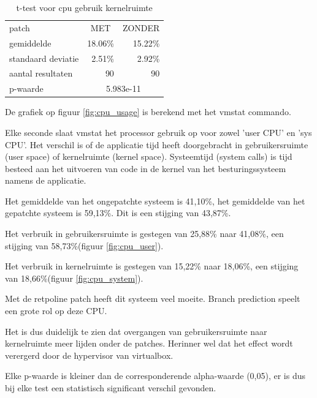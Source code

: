 \begin{table}[]
	\centering
	\caption{t-test voor cpu gebruik kernelruimte}
	\label{t_cpu_sys}
	\begin{tabular}{l|rr}
		\hline
		patch              & \multicolumn{1}{c}{MET} & \multicolumn{1}{c}{ZONDER} \\
		gemiddelde         & 18.06\%                 & 15.22\%                    \\
		standaard deviatie & 2.51\%                  & 2.92\%                     \\
		aantal resultaten  & 90                      & 90                         \\ \hline
		p-waarde           & \multicolumn{2}{c|}{5.983e-11}                      
	\end{tabular}
\end{table}


De grafiek op figuur \ref{fig:cpu_usage} is berekend met het vmstat commando.

Elke seconde slaat vmstat het processor gebruik op voor zowel 'user CPU' en 'sys CPU'.
Het verschil is of de applicatie tijd heeft doorgebracht in gebruikersruimte (user space) of kernelruimte (kernel space).
Systeemtijd (system calls) is tijd besteed aan het uitvoeren van code in de kernel van het besturingssysteem namens de applicatie.

Het gemiddelde van het ongepatchte systeem is 41,10\%, het gemiddelde van het gepatchte systeem is 59,13\%. Dit is een stijging van 43,87\%.

Het verbruik in gebruikersruimte is gestegen van 25,88\% naar 41,08\%, een stijging van 58,73\%(figuur \ref{fig:cpu_user}).

Het verbruik in kernelruimte is gestegen van 15,22\% naar 18,06\%, een stijging van 18,66\%(figuur \ref{fig:cpu_system}).

Met de retpoline patch heeft dit systeem veel moeite. Branch prediction speelt een grote rol op deze CPU.

Het is dus duidelijk te zien dat overgangen van gebruikersruimte naar kernelruimte meer lijden onder de patches.
Herinner wel dat het effect wordt verergerd door de hypervisor van virtualbox.


Elke p-waarde is kleiner dan de corresponderende alpha-waarde (0,05), er is dus bij elke test een statistisch
significant verschil gevonden.







